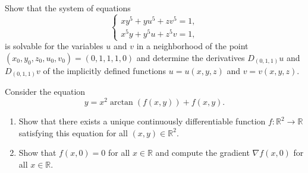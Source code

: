 
\begin{exercise}
\label{ex:implicit_system_5var}
Show that the system of equations
\[\begin{cases} xy^5+yu^5+zv^5=1, \\ x^5y+y^5u+z^5v=1, \end{cases}\]
is solvable for the variables $u$ and $v$ in a neighborhood of the point
$(x_0,y_0,z_0,u_0,v_0) = (0,1,1,1,0)$ and determine the derivatives $D_{(0,1,1)}u$ and
$D_{(0,1,1)}v$ of the implicitly defined functions $u=u(x,y,z)$ and $v=v(x,y,z)$.
\end{exercise}

\begin{exercise}
\label{ex:implicit_function_arctan}
Consider the equation
\[y = x^2 \arctan(f(x,y)) + f(x,y).\]
\begin{enumerate}[label=\textbf{(\alph*)}]
  \item Show that there exists a unique continuously differentiable function $f : \mathbb{R}^2 \to \mathbb{R}$ satisfying this equation for all $(x,y) \in \mathbb{R}^2$.
  \item Show that $f(x,0) = 0$ for all $x \in \mathbb{R}$ and compute the gradient $\nabla f(x,0)$ for all $x \in \mathbb{R}$.
\end{enumerate}
\end{exercise}

